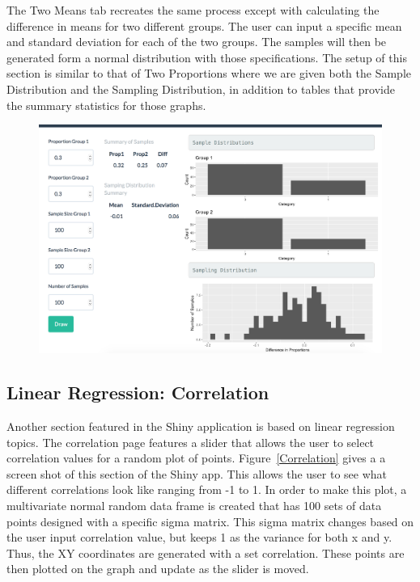 \documentclass[11pt]{book}
\begin{document}
The Two Means tab recreates the same process except with calculating the difference in means for two different groups. The user can input a specific mean and standard deviation for each of the two groups. The samples will then be generated form a normal distribution with those specifications. The setup of this section is similar to that of Two Proportions where we are given both the Sample Distribution and the Sampling Distribution, in addition to tables that provide the summary statistics for those graphs.

\begin{figure}[H]
\centering
        \includegraphics[width=\textwidth]{TwoProp.png}
        \label{fig:TwoProp}
\end{figure}


\subsection{Linear Regression: Correlation}
Another section featured in the Shiny application is based on linear regression topics. The correlation page features a slider that allows the user to select correlation values for a random plot of points. Figure~\ref{Correlation}  gives a a screen shot of this section of the Shiny app. This allows the user to see what different correlations look like ranging from -1 to 1. In order to make this plot, a multivariate normal random data frame is created that has 100 sets of data points designed with a specific sigma matrix.  This sigma matrix changes based on the user input correlation value, but keeps 1 as the variance for both x and y.  Thus, the XY coordinates are generated with a set correlation. These points are then plotted on the graph and update as the slider is moved. 
\end{document}
